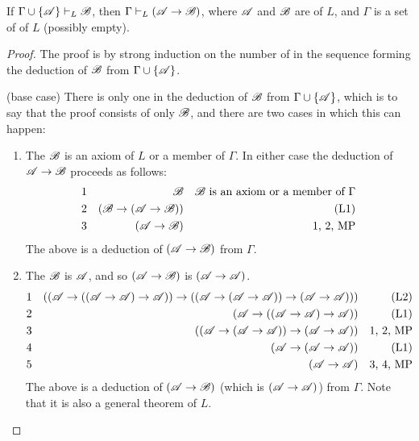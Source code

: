 \setcounter{definition}{7}
\begin{proposition}
  If \(\Gamma \cup \{\mathscr{A}\} \vdash_{L} \mathscr{B}\), then \(\Gamma \vdash_{L} (\mathscr{A} \rightarrow \mathscr{B})\), where \(\mathscr{A}\) and \(\mathscr{B}\) are \wfs{} of \(L\), and \(\Gamma\) is a set of \wfs{} of \(L\) (possibly empty).

  \begin{proof}
    The proof is by strong induction on the number of \wfs{} in the sequence forming the deduction of \(\mathscr{B}\) from \(\Gamma \cup \{\mathscr{A}\}\).

    (base case) There is only one \wf{} in the deduction of \(\mathscr{B}\) from \(\Gamma \cup \{\mathscr{A}\}\), which is to say that the proof consists of only \(\mathscr{B}\), and there are two cases in which this can happen:
    \begin{enumerate}
      \item The \wf{} \(\mathscr{B}\) is an axiom of \(L\) or a member of \(\Gamma\). In either case the deduction of \(\mathscr{A} \rightarrow \mathscr{B}\) proceeds as follows:
        \begin{align*}
          \text{1}&&
          \mathscr{B}&&
          \text{\(\ensuremath\mathscr{B}\) is an axiom or a member of \(\Gamma\)}\\
          \text{2}&&
          (\mathscr{B} \rightarrow (\mathscr{A} \rightarrow \mathscr{B}))&&
          \text{(L1)}\\
          \text{3}&&
          (\mathscr{A} \rightarrow \mathscr{B})&&
          \text{1, 2, MP}
        \end{align*}
        The above is a deduction of \((\mathscr{A} \rightarrow \mathscr{B})\) from \(\Gamma\).

      \item The \wf{} \(\mathscr{B}\) is \(\mathscr{A}\), and so \((\mathscr{A} \rightarrow \mathscr{B})\) is \((\mathscr{A} \rightarrow \mathscr{A})\). 
        \begin{align*}
          \text{1}&&
          ((\mathscr{A} \rightarrow ((\mathscr{A} \rightarrow \mathscr{A}) \rightarrow \mathscr{A})) \rightarrow ((\mathscr{A} \rightarrow (\mathscr{A} \rightarrow \mathscr{A})) \rightarrow (\mathscr{A} \rightarrow \mathscr{A})))&&
          \text{(L2)}\\
          \text{2}&&
          (\mathscr{A} \rightarrow ((\mathscr{A} \rightarrow \mathscr{A}) \rightarrow \mathscr{A}))&&
          \text{(L1)}\\
          \text{3}&&
          ((\mathscr{A} \rightarrow (\mathscr{A} \rightarrow \mathscr{A})) \rightarrow (\mathscr{A} \rightarrow \mathscr{A}))&&
          \text{1, 2, MP}\\
          \text{4}&&
          (\mathscr{A} \rightarrow (\mathscr{A} \rightarrow \mathscr{A}))&&
          \text{(L1)}\\
          \text{5}&&
          (\mathscr{A} \rightarrow \mathscr{A})&&
          \text{3, 4, MP}
        \end{align*}
        The above is a deduction of \((\mathscr{A} \rightarrow \mathscr{B})\) (which is \((\mathscr{A} \rightarrow \mathscr{A})\)) from \(\Gamma\). Note that it is also a general theorem of \(L\).
    \end{enumerate}


\end{proof}
\end{proposition}

